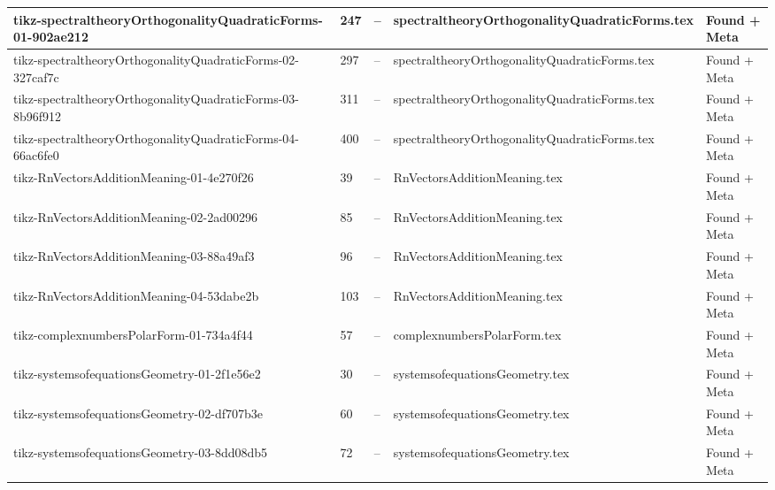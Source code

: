\documentclass[11pt]{article}
\begin{document}
\begin{longtable}{|p{3.5cm}|p{1.5cm}|p{1cm}|p{4cm}|p{2cm}|}
tikz-spectraltheoryOrthogonalityQuadraticForms-01-902ae212 & 247 & -- & spectraltheoryOrthogonalityQuadraticForms.tex & \textcolor{found}{Found + Meta} \\
\hline

tikz-spectraltheoryOrthogonalityQuadraticForms-02-327caf7c & 297 & -- & spectraltheoryOrthogonalityQuadraticForms.tex & \textcolor{found}{Found + Meta} \\
\hline

tikz-spectraltheoryOrthogonalityQuadraticForms-03-8b96f912 & 311 & -- & spectraltheoryOrthogonalityQuadraticForms.tex & \textcolor{found}{Found + Meta} \\
\hline

tikz-spectraltheoryOrthogonalityQuadraticForms-04-66ac6fe0 & 400 & -- & spectraltheoryOrthogonalityQuadraticForms.tex & \textcolor{found}{Found + Meta} \\
\hline

tikz-RnVectorsAdditionMeaning-01-4e270f26 & 39 & -- & RnVectorsAdditionMeaning.tex & \textcolor{found}{Found + Meta} \\
\hline

tikz-RnVectorsAdditionMeaning-02-2ad00296 & 85 & -- & RnVectorsAdditionMeaning.tex & \textcolor{found}{Found + Meta} \\
\hline

tikz-RnVectorsAdditionMeaning-03-88a49af3 & 96 & -- & RnVectorsAdditionMeaning.tex & \textcolor{found}{Found + Meta} \\
\hline

tikz-RnVectorsAdditionMeaning-04-53dabe2b & 103 & -- & RnVectorsAdditionMeaning.tex & \textcolor{found}{Found + Meta} \\
\hline

tikz-complexnumbersPolarForm-01-734a4f44 & 57 & -- & complexnumbersPolarForm.tex & \textcolor{found}{Found + Meta} \\
\hline

tikz-systemsofequationsGeometry-01-2f1e56e2 & 30 & -- & systemsofequationsGeometry.tex & \textcolor{found}{Found + Meta} \\
\hline

tikz-systemsofequationsGeometry-02-df707b3e & 60 & -- & systemsofequationsGeometry.tex & \textcolor{found}{Found + Meta} \\
\hline

tikz-systemsofequationsGeometry-03-8dd08db5 & 72 & -- & systemsofequationsGeometry.tex & \textcolor{found}{Found + Meta} \\
\hline


\end{longtable}
\end{document}
